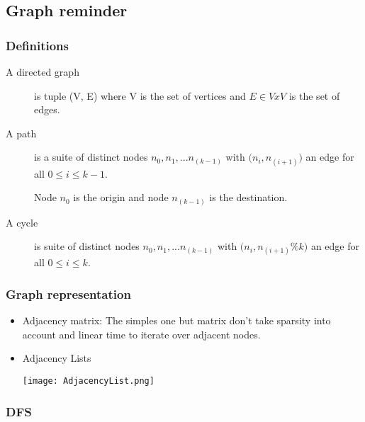 \subsection{Graph reminder}

\subsubsection{Definitions}

\begin{description}
    \item[A directed graph] is tuple (V, E) where V is the set of vertices 
        and $E \in V x V$ is the set of edges.

    \item[A path] is a suite of distinct nodes $n_0, n_1, ... n_{(k-1)}$ with
        $\big(n_i, n_{(i+1)}\big)$ an
        edge for all $0 \leq i \le k-1$. 

    Node $n_0$ is the origin and node $n_{(k-1)}$ is the
        destination.

    \item[A cycle] is suite of distinct nodes  $n_0, n_1, ... n_{(k-1)}$ with
        $\big(n_i, n_{(i+1)}\% k\big)$ an edge for all $0 \leq i \le k$.
\end{description}

\subsubsection{Graph representation}

\begin{itemize}
    \item Adjacency matrix: The simples one but matrix don't take
        sparsity into account and linear time to iterate over adjacent
        nodes.

    \item Adjacency Lists

        \begin{center}
            \texttt{[image: AdjacencyList.png]}
        \end{center}
\end{itemize}


\subsubsection{DFS}

